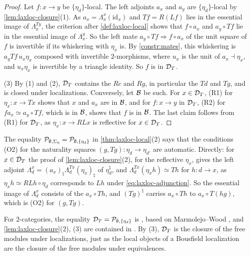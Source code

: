 \begin{proof}
Let $f\colon x \to y$ be $\{\eta_{d}\}$-local. The left adjoints $a_{x}$ and
$a_{y}$ are $\{\eta_{d}\}$-local by \cref{lem:laxloc-closure}(1). As
$a_{x} = \Lambda^{x}_{x}(\mathrm{id}_{x})$
and $Tf = R(Lf)$ lies in the essential image of $\Lambda^{Ty}_{x}$,
the criterion
after \cref{def:laxloc-local} shows that $f \circ a_{x}$ and
$a_{y} \circ Tf$
lie in the essential image of $\Lambda^{y}_{x}$. So the left mate
$a_{y} \circ Tf \Rightarrow f \circ a_{x}$
of the unit square of $f$ is invertible if its whiskering with $\eta_{x}$ is.
By \cref{constr:mates}, this whiskering is
$a_{y}Tf\,u_{x}\eta_{x}$
composed
with invertible $2$-morphisms, where $u_{x}$ is the unit of
$a_{x} \dashv \eta_{x}$,
and $u_{x}\eta_{x}$ is invertible by a triangle identity. So $f$ is in
$\mathcal{D}_{T}$.

(3) By (1) and (2), $\mathcal{D}_{T}$ contains the $Rc$ and $Rg$, in particular the $Td$
and $Tg$, and is closed under localizations. Conversely, let $\mathcal{B}$ be such. For
$x \in \mathcal{D}_{T}$, (R1) for
$\eta_{x}\colon x \to Tx$
shows that $x$ and $a_{x}$ are in $\mathcal{B}$, and for $f\colon x \to y$ in $\mathcal{D}_{T}$,
(R2) for
$fa_{x} \simeq a_{y} \circ Tf$,
which is in $\mathcal{B}$, shows that $f$ is in $\mathcal{B}$. The last claim follows from (R1)
for $\mathcal{D}_{T}$, as
$\eta_{x}\colon x \to RLx$
is reflective for $x \in \mathcal{D}_{T}$.
\end{proof}

\begin{rmk}
\label{rmk:laxloc-squares}
%
The equality
$\mathcal{P}_{\emptyset,\Sigma_{\eta}} = \mathcal{P}_{\emptyset,\{\eta_{d}\}}$
in \cref{thm:laxloc-local}(2) says that the conditions (O2) for the naturality
squares
$(g,Tg)\colon \eta_{d} \to \eta_{d'}$
are automatic. Directly: for $x \in \mathcal{D}_{T}$ the proof of
\cref{lem:laxloc-closure}(2), for the reflective $\eta_{x}$, gives the left
adjoint
$\Lambda^{x}_{d} = (a_{x})_{\natural}\Lambda^{Tx}_{d}(\eta_{x})_{\natural}$
of $\eta_{d}^{\natural}$, and
$\Lambda^{Tx}_{d}(\eta_{x}h) \simeq Th$
for
$h\colon d \to x$,
as
$\eta_{x}h \simeq RLh \circ \eta_{d}$
corresponds to $Lh$ under \eqref{eq:laxloc-adjunction}.
So the essential image of $\Lambda^{x}_{d}$ consists of the
$a_{x} \circ Th$,
and $(Tg)^{\natural}$ carries
$a_{x} \circ Th$
to
$a_{x} \circ T(hg)$,
which is (O2) for $(g,Tg)$.
\end{rmk}

\begin{rmk}
\label{rmk:laxloc-local}
%
For $2$-categories, the equality
$\mathcal{D}_{T} = \mathcal{P}_{\emptyset,\{\eta_{d}\}}$
is \cite[Thm.~2.7]{dilibertilobbiasousa2022kz}, based on Marmolejo--Wood
\cite{marmolejowood2012kan}, and \cref{lem:laxloc-closure}(2), (3) are
contained in \cite[Lemma~2.6]{dilibertilobbiasousa2022kz}. By (3), $\mathcal{D}_{T}$ is
the closure of the free modules under localizations, just as the local objects
of a Bousfield localization are the closure of the free modules under
equivalences.
\end{rmk}

